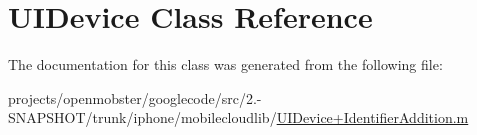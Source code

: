 \hypertarget{class_u_i_device}{
\section{\-U\-I\-Device \-Class \-Reference}
\label{class_u_i_device}
}


\-The documentation for this class was generated from the following file\-:\begin{DoxyCompactItemize}
\item 
projects/openmobster/googlecode/src/2.-\/\-S\-N\-A\-P\-S\-H\-O\-T/trunk/iphone/mobilecloudlib/\hyperlink{_u_i_device_09_identifier_addition_8m}{\-U\-I\-Device+\-Identifier\-Addition.\-m}\end{DoxyCompactItemize}
